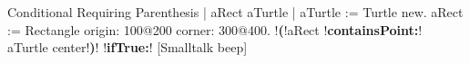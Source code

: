 \documentclass[a4paper,10pt,twoside]{book}
\begin{document}
\begin{script}{Conditional Requiring Parenthesis}\label{scr:withParenthesis2}
| aRect aTurtle |
aTurtle := Turtle new.
aRect := Rectangle origin: 100@200 corner: 300@400.
!\textbf{(}!aRect !\textbf{containsPoint:}! aTurtle center!\textbf{)}!
    !\textbf{ifTrue:}! [Smalltalk beep]
\end{script}





\ifx\wholebook\relax\else
\end{document}
